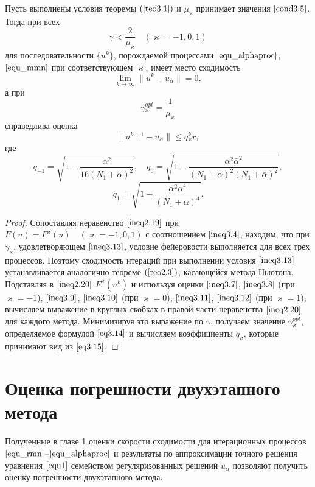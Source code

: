 \begin{theorem}\label{teo3.2}
	Пусть выполнены условия теоремы $(\ref{teo3.1})$ и $\mu_\varkappa$ принимает значения $\eqref{cond3.5}$. Тогда при всех
	\begin{equation}\label{ineq3.13}
	\gamma <\frac{2}{\mu _\varkappa}\quad (\varkappa=-1,0,1)
	\end{equation}
	для последовательности $\{u^k\}$, порождаемой процессами $\eqref{equ_alphaproc}$, $\eqref{equ_mmn}$ при соответствующем $\varkappa$, имеет место сходимость $$\lim_{k\to\infty}\|u^k-u_\alpha\|=0,$$ а при 
	\begin{equation}\label{eq3.14}
	\gamma{_\varkappa^{opt}}=\frac{1}{\mu_\varkappa}
	\end{equation}
	справедлива оценка $$\|u^{k+1}-u_\alpha\|\le q{_\varkappa^k}r,$$ где
	$$q_{-1}=\sqrt{1-\frac{\alpha^2}{16(N_1+\alpha)^2}}, \quad q_0=\sqrt{1-\frac{\alpha^2\bar\alpha^2}{(N_1+\alpha)^2(N_1+\bar\alpha)^2}},$$
	\begin{equation}\label{eq3.15}
	q_1=\sqrt{1-\frac{\alpha^2\bar\alpha^4}{(N_1+\bar\alpha)^4}}.
	\end{equation}
\end{theorem}
\begin{proof} Сопоставляя неравенство $\eqref{ineq2.19}$ при $F(u)=F^\varkappa(u) \quad (\varkappa=-1,0,1)$ с соотношением $\eqref{ineq3.4}$, находим, что при $\gamma_\varkappa$, удовлетворяющем  $\eqref{ineq3.13}$, условие фейеровости выполняется для всех трех процессов. Поэтому сходимость итераций при выполнении условия $\eqref{ineq3.13}$ устанавливается аналогично теореме $(\ref{teo2.3})$, касающейся метода Ньютона. Подставляя в $\eqref{ineq2.20}$ $F^\varkappa(u^k)$ и используя оценки $\eqref{ineq3.7}$, $\eqref{ineq3.8}$ (при $\varkappa=-1$), $\eqref{ineq3.9}$, $\eqref{ineq3.10}$ (при $\varkappa=0$), $\eqref{ineq3.11}$, $\eqref{ineq3.12}$ (при $\varkappa=1$), вычисляем выражение в круглых скобках в правой части неравенства $\eqref{ineq2.20}$ для каждого метода. Минимизируя это выражение по $\gamma$, получаем значение $\gamma{_\varkappa^{opt}}$, определяемое формулой $\eqref{eq3.14}$ и вычисляем коэффициенты $q_\varkappa$, которые принимают вид из $\eqref{eq3.15}$.
\end{proof}

\newpage
\section{Оценка погрешности двухэтапного метода}

Полученные в главе 1 оценки скорости сходимости для итерационных процессов $\eqref{equ_rmn}$--$\eqref{equ_alphaproc}$ и результаты по аппроксимации точного решения уравнения $\eqref{equ1}$ семейством регуляризованных решений $u_\alpha$ позволяют получить оценку погрешности двухэтапного метода.

